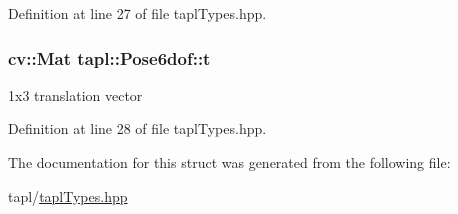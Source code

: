 Definition at line 27 of file tapl\+Types.\+hpp.

\subsubsection[{\texorpdfstring{t}{t}}]{\setlength{\rightskip}{0pt plus 5cm}cv\+::\+Mat tapl\+::\+Pose6dof\+::t}\hypertarget{structtapl_1_1Pose6dof_aaac0151b90bd28d462e400e5b5dbefcb}{}\label{structtapl_1_1Pose6dof_aaac0151b90bd28d462e400e5b5dbefcb}
1x3 translation vector 

Definition at line 28 of file tapl\+Types.\+hpp.



The documentation for this struct was generated from the following file\+:\begin{DoxyCompactItemize}
\item 
tapl/\hyperlink{taplTypes_8hpp}{tapl\+Types.\+hpp}\end{DoxyCompactItemize}
